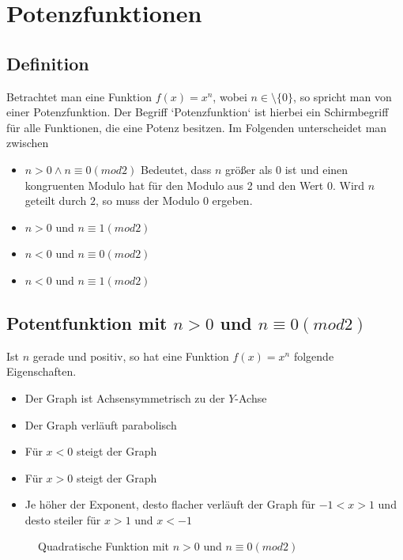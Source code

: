 \section{Potenzfunktionen}
\subsection{Definition}
Betrachtet man eine Funktion $f(x)=x^n$, wobei $n\in\setminus\{0\}$, so spricht man von einer Potenzfunktion. Der Begriff `{}Potenzfunktion`{} ist hierbei ein Schirmbegriff für alle Funktionen, die eine Potenz besitzen. Im Folgenden unterscheidet man zwischen
\begin{itemize}
	\item $n>0 \land n\equiv0(mod2)$ Bedeutet, dass $n$ größer als 0 ist und einen kongruenten Modulo hat für den Modulo aus 2 und den Wert $0$. Wird $n$ geteilt durch $2$, so muss der Modulo $0$ ergeben.
	\item $n>0$ und $ n\equiv1(mod2)$
	\item $n<0$ und $ n\equiv0(mod2)$
	\item $n<0$ und $ n\equiv1(mod2)$
\end{itemize}
\subsection{Potentfunktion mit $n>0 $ und $ n\equiv0(mod2)$}
Ist $n$ gerade und positiv, so hat eine Funktion $f(x)=x	^n$ folgende Eigenschaften.
\begin{itemize}
	\item Der Graph ist Achsensymmetrisch zu der $Y$-Achse
	\item Der Graph verläuft parabolisch
	\item Für $x<0$ steigt der Graph
	\item Für $x>0$ steigt der Graph
	\item Je höher der Exponent, desto flacher verläuft der Graph für $-1<x>1$ und desto steiler für $x>1$ und $x<-1$
\end{itemize}
\begin{figure}[h!]
\centering
{}
\caption{Quadratische Funktion mit $n>0$ und $ n\equiv0(mod2)$}
\end{figure}
